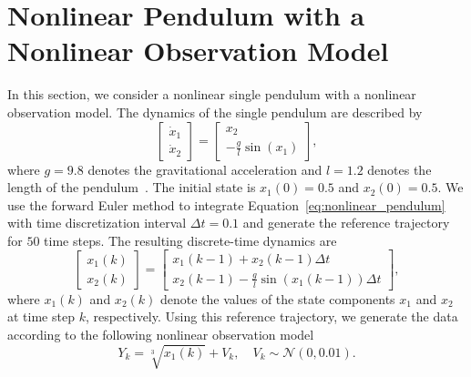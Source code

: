 \documentclass[preprint,3p,times]{elsarticle}
\begin{document}
\section{Nonlinear Pendulum with a Nonlinear Observation Model}
\label{sec:nonlinear_observations}
In this section, we consider a nonlinear single pendulum with a nonlinear observation model. The dynamics of the single pendulum are described by
\begin{equation}
\begin{bmatrix}
\dot{x}_1 \\ \dot{x}_2 
\end{bmatrix}
=
\begin{bmatrix}
x_2 \\
-\frac{g}{l}\sin(x_1)
\end{bmatrix},
\label{eq:nonlinear_pendulum}
\end{equation}
where $g=9.8$ denotes the gravitational acceleration and $l=1.2$ denotes the length of the pendulum~\cite{fbovi}. The initial state is $x_1(0)=0.5$ and $x_2(0)=0.5$. We use the forward Euler method to integrate Equation~\eqref{eq:nonlinear_pendulum} with time discretization interval $\Delta t=0.1$ and generate the reference trajectory for $50$ time steps. The resulting discrete-time dynamics are
\begin{equation}
\begin{bmatrix}
x_1(k) \\ x_2(k) 
\end{bmatrix}
=
\begin{bmatrix}
x_1(k-1)+x_2(k-1)\Delta t \\
x_2(k-1)-\frac{g}{l}\sin(x_1(k-1))\Delta t
\end{bmatrix},
\end{equation}
where $x_1(k)$ and $x_2(k)$ denote the values of the state components $x_1$ and $x_2$ at time step $k$, respectively. Using this reference trajectory, we generate the data according to the following nonlinear observation model
\begin{equation}
Y_k = \sqrt[3]{x_1(k)} + V_k, \quad V_k \sim \mathcal{N}(0, 0.01).
\label{eq:nonlinear_pendulum_obs}
\end{equation}
\end{document}
